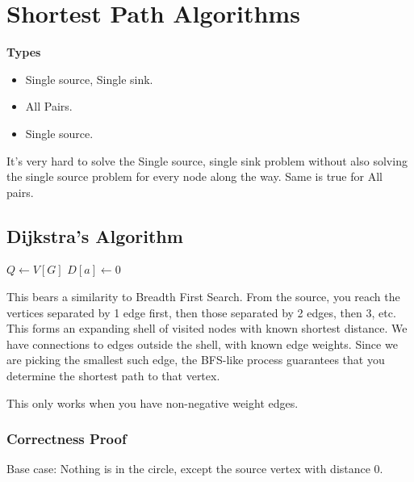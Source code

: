 \documentclass[english, 10pt]{article}
\begin{document}
\section{Shortest Path Algorithms}
\textbf{Types}
\begin{itemize}
    \item Single source, Single sink.
    \item All Pairs.
    \item Single source.
\end{itemize}

It's very hard to solve the Single source, single sink problem without also
solving the single source problem for every node along the way. Same is true
for All pairs.

\subsection{Dijkstra's Algorithm}

\begin{algorithm}[H]
    $Q \gets V[G]$ 
    $D[a] \gets 0$\;
\end{algorithm}

This bears a similarity to Breadth First Search. From the source, you reach the
vertices separated by 1 edge first, then those separated by 2 edges, then 3,
etc.  This forms an expanding shell of visited nodes with known shortest
distance.  We have connections to edges outside the shell, with known edge
weights. Since we are picking the smallest such edge, the BFS-like process
guarantees that you determine the shortest path to that vertex.

This only works when you have non-negative weight edges.

\subsubsection{Correctness Proof}

Base case: Nothing is in the circle, except the source vertex with distance 0.
\end{document}
